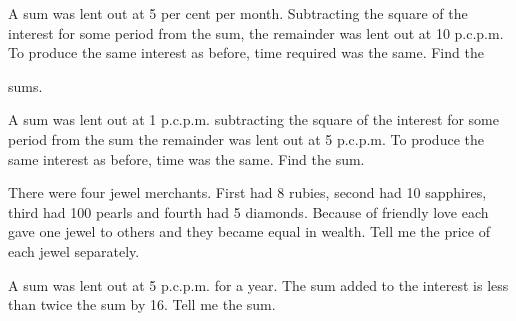 \documentclass[]{article}
\begin{document}
{{A sum was lent out at 5 per cent per month. Subtracting the square of
the interest for some period from the sum, the remainder was lent out at
10 p.c.p.m. To produce the same interest as before, time required was
the same. Find the }
\newpage
\large

\noindent sums.

\begin{quote}  {
}  \end{quote}

{A sum was lent out at 1 p.c.p.m. subtracting the square of the
interest for some period from the sum the remainder was lent out at 5 p.c.p.m. To produce the same interest as before, time was the same. Find
the sum.}

\begin{quote}  {
}  \end{quote}

{There were four jewel merchants. First had 8 rubies, second had 10
sapphires, third had 100 pearls and fourth had 5 diamonds. Because of
friendly love each gave one jewel to others and they became equal in
wealth. Tell me the price of each jewel separately.}

\begin{quote}  {
}  \end{quote}

{A sum was lent out at 5 p.c.p.m. for a year. The sum added to the
interest is less than twice the sum by 16. Tell me the sum.}

\begin{quote}  {}
\end{quote}}
\end{document}

